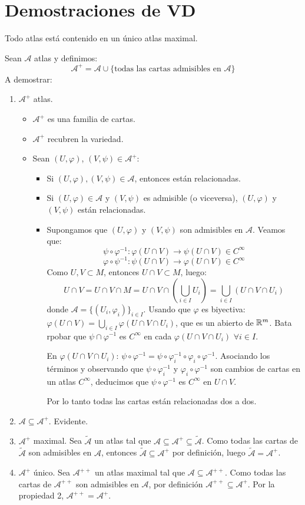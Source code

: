 \documentclass[twoside]{report}
\newcommand {\At} {{\mathcal{A}}}
\begin{document}
\chapter{Demostraciones de VD}

\begin{prop}
Todo atlas está contenido en un único atlas maximal.
\end{prop}

\begin{dem}
Sean $\At$ atlas y definimos:
\[ \At^+ = \At \cup \{\text{todas las cartas admisibles en }\At \} \]
A demostrar:
\begin{enumerate}
	\item $\At^+$ atlas.
	\begin{itemize}
		\item $\At^+$ es una familia de cartas.
		\item $\At^+$ recubren la variedad.
		\item Sean $(U,φ)$, $(V,ψ) \in \At^+$:
		\begin{itemize}
			\item Si $(U,φ), (V,ψ) \in \At$, entonces están relacionadas.
			\item Si $(U,φ) \in \At$ y $(V,ψ)$ es admisible (o viceversa), $(U,φ)$ y $(V,ψ)$ están relacionadas.
			\item Supongamos que $(U,φ)$ y $(V,ψ)$ son admisibles en $\At$. Veamos que:
			\[ ψ \circ φ^{-1} : φ(U\cap V) \to ψ(U \cap V) \in C^{\infty} \]
			\[ φ \circ ψ^{-1} : ψ(U\cap V) \to φ(U \cap V) \in C^{\infty} \]
			Como $U,V \subset M$, entonces $U \cap V \subset M$, luego:
			\[ U \cap V = U \cap V \cap M = U \cap V \cap \left(\bigcup_{i \in I}U_i\right) = \bigcup_{i \in I}(U \cap V \cap U_i) \]
			donde $\At = \{(U_i,φ_i)\}_{i \in I}$. Usando que $φ$ es biyectiva: $φ(U \cap V) = \bigcup_{i \in I} φ(U \cap V \cap U_i)$, que es un abierto de $\mathbb{R}^m$. Bata rpobar que $ψ \cap φ^{-1}$ es $C^\infty$ en cada $φ(U \cap V \cap U_i)$ $\forall i \in I$.

			En $φ(U \cap V \cap U_i)$: $ψ \circ φ^{-1} = ψ \circ φ_i^{-1} \circ φ_i \circ φ^{-1}$. Asociando los términos y observando que $ψ \circ φ_i^{-1}$ y $φ_i \circ φ^{-1}$ son cambios de cartas en un atlas $C^\infty$, deducimos que $ψ \circ φ^{-1}$ es $C^\infty$ en $U \cap V$.

			Por lo tanto todas las cartas están relacionadas dos a dos.
		\end{itemize}
	\end{itemize}
	\item $\At \subseteq \At^+$. Evidente.
	\item $\At^+$ maximal. Sea $\tilde{\At}$ un atlas tal que $\At \subseteq \At^+ \subseteq \tilde{\At}$. Como todas las cartas de $\tilde{\At}$ son admisibles en $\At$, entonces $\tilde{\At} \subseteq \At^+$ por definición, luego $\tilde{\At} = \At^+$.
	\item $\At^+$ único. Sea $\At^{++}$ un atlas maximal tal que $\At \subseteq \At^{++}$. Como todas las cartas de $\At^{++}$ son admisibles en $\At$, por definición $\At^{++} \subseteq \At^+$. Por la propiedad 2, $\At^{++} = \At^+$.
\end{enumerate}
\end{dem}
\end{document}
